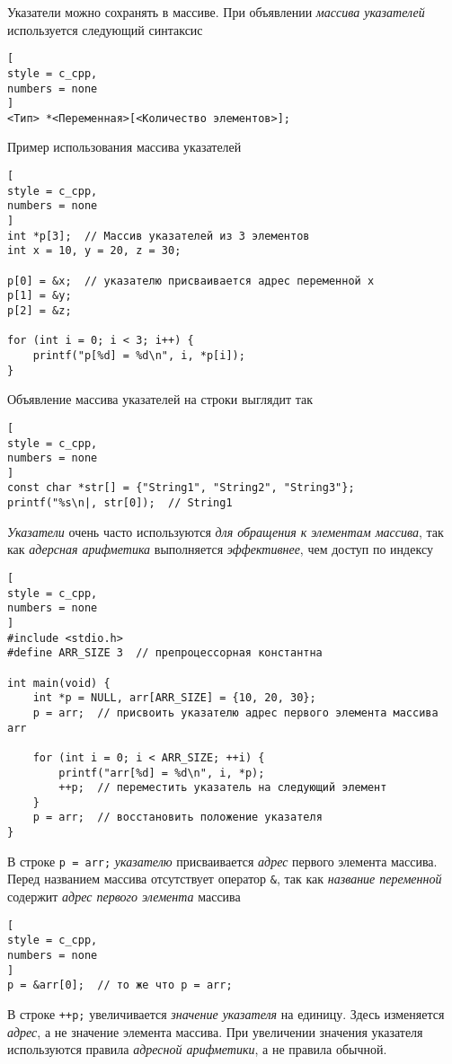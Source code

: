 \documentclass[%
	11pt,
	a4paper,
	utf8,
		]{article}
\begin{document}
Указатели можно сохранять в массиве. При объявлении \emph{массива указателей} используется следующий синтаксис
\begin{lstlisting}[
style = c_cpp,
numbers = none
]
<Тип> *<Переменная>[<Количество элементов>];
\end{lstlisting}

Пример использования массива указателей
\begin{lstlisting}[
style = c_cpp,
numbers = none
]
int *p[3];  // Массив указателей из 3 элементов
int x = 10, y = 20, z = 30;

p[0] = &x;  // указателю присваивается адрес переменной x
p[1] = &y;
p[2] = &z;

for (int i = 0; i < 3; i++) {
    printf("p[%d] = %d\n", i, *p[i]);
}
\end{lstlisting}

Объявление массива указателей на строки выглядит так
\begin{lstlisting}[
style = c_cpp,
numbers = none
]
const char *str[] = {"String1", "String2", "String3"};
printf("%s\n|, str[0]);  // String1
\end{lstlisting}

\emph{Указатели} очень часто используются \emph{для обращения к элементам массива}, так как \emph{адерсная арифметика} выполняется \emph{эффективнее}, чем доступ по индексу \cite[]{prokhorenok-prog-c:2020}
\begin{lstlisting}[
style = c_cpp,
numbers = none
]
#include <stdio.h>
#define ARR_SIZE 3  // препроцессорная константна

int main(void) {
    int *p = NULL, arr[ARR_SIZE] = {10, 20, 30};
    p = arr;  // присвоить указателю адрес первого элемента массива arr
    
    for (int i = 0; i < ARR_SIZE; ++i) {
        printf("arr[%d] = %d\n", i, *p);
        ++p;  // переместить указатель на следующий элемент
    }
    p = arr;  // восстановить положение указателя
}
\end{lstlisting}

В строке \verb|p = arr;| \emph{указателю} присваивается \emph{адрес} первого элемента массива. Перед названием массива отсутствует оператор \verb|&|, так как \emph{название переменной} содержит \emph{адрес первого элемента} массива
\begin{lstlisting}[
style = c_cpp,
numbers = none
]
p = &arr[0];  // то же что p = arr;
\end{lstlisting}

В строке \verb*|++p;| увеличивается \emph{значение указателя} на единицу. Здесь изменяется \emph{адрес}, а не значение элемента массива. При увеличении значения указателя используются правила \emph{адресной арифметики}, а не правила обычной.
\end{document}
